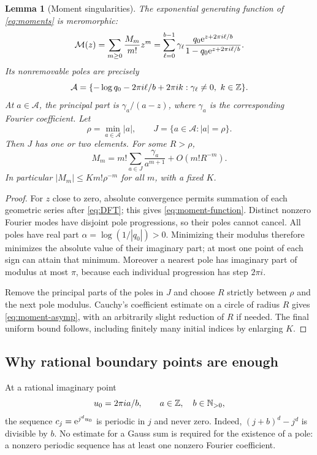 \documentclass[11pt,a4paper]{article}
\numberwithin{equation}{section}
\newtheorem{lemma}[theorem]{Lemma}
\theoremstyle{definition}\newtheorem{definition}[theorem]{Definition}
\theoremstyle{remark}\newtheorem{remark}[theorem]{Remark}
\theoremstyle{definition}
\begin{document}
\begin{lemma}[Moment singularities]
\label{lem:poles}
The exponential generating function of \eqref{eq:moments} is meromorphic:
\begin{equation}
 \mathcal M(z)=\sum_{m\ge0}\frac{M_m}{m!}z^m
 =\sum_{\ell=0}^{b-1}\gamma_\ell
  \frac{q_0\mathrm e^{z+2\pi i\ell/b}}{1-q_0\mathrm e^{z+2\pi i\ell/b}}.
 \label{eq:moment-function}
\end{equation}
Its nonremovable poles are precisely
\begin{equation}
 \mathcal A=\{-\log q_0-2\pi i\ell/b+2\pi i k:
              \gamma_\ell\ne0,\ k\in\mathbb Z\}.
 \label{eq:poles}
\end{equation}
At $a\in\mathcal A$, the principal part is $\gamma_a/(a-z)$, where
$\gamma_a$ is the corresponding Fourier coefficient. Let
\[
 \rho=\min_{a\in\mathcal A}|a|,\qquad
 J=\{a\in\mathcal A:|a|=\rho\}.
\]
Then $J$ has one or two elements. For some $R>\rho$,
\begin{equation}
 M_m=m!\sum_{a\in J}\frac{\gamma_a}{a^{m+1}}+O(m!R^{-m}).
 \label{eq:moment-asymp}
\end{equation}
In particular $|M_m|\le K m!\rho^{-m}$ for all $m$, with a fixed $K$.
\end{lemma}
\begin{proof}
For $z$ close to zero, absolute convergence permits summation of each
geometric series after \eqref{eq:DFT}; this gives
\eqref{eq:moment-function}. Distinct nonzero Fourier modes have disjoint pole
progressions, so their poles cannot cancel. All poles have real part
$\alpha=\log(1/|q_0|)>0$. Minimizing their modulus therefore minimizes the
absolute value of their imaginary part; at most one point of each sign can
attain that minimum. Moreover a nearest pole has imaginary part of modulus at
most $\pi$, because each individual progression has step $2\pi i$.

Remove the principal parts of the poles in $J$ and choose $R$ strictly between
$\rho$ and the next pole modulus. Cauchy's coefficient estimate on a circle of
radius $R$ gives \eqref{eq:moment-asymp}, with an arbitrarily slight reduction
of $R$ if needed. The final uniform bound follows, including finitely many
initial indices by enlarging $K$.
\end{proof}

\subsection{Why rational boundary points are enough}
At a rational imaginary point
\begin{equation}
 u_0=2\pi i a/b,\qquad a\in\mathbb Z,\quad b\in\mathbb N_{>0},
 \label{eq:rational-point}
\end{equation}
the sequence $c_j=\mathrm e^{j^d u_0}$ is periodic in $j$ and never zero. Indeed,
$(j+b)^d-j^d$ is divisible by $b$. No estimate for a Gauss sum is required
for the existence of a pole: a nonzero periodic sequence has at least one
nonzero Fourier coefficient.
\end{document}
